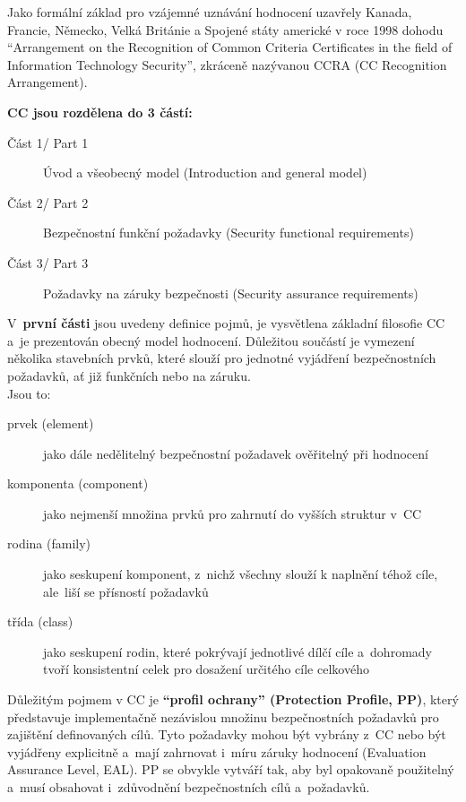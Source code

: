 \documentclass[a4paper,12pt]{article}
\renewcommand{\b}[1]{\textbf{#1}} %
\begin{document}
Jako formální základ pro vzájemné uznávání hodnocení uzavřely Kanada, Francie, Německo, Velká Británie a Spojené státy americké v roce 1998 dohodu “Arrangement on the Recognition of
Common Criteria Certificates in the field of Information Technology Security”, zkráceně nazývanou CCRA (CC Recognition Arrangement).~\cite{NBUHodnoceniBezpecnostiSW}

\b{CC jsou rozdělena do 3 částí:}
\begin{description}
 \item[Část 1/ Part 1] Úvod a všeobecný model (Introduction and general model)
 \item[Část 2/ Part 2] Bezpečnostní funkční požadavky (Security functional requirements)
 \item[Část 3/ Part 3] Požadavky na záruky bezpečnosti (Security assurance requirements)
 \end{description}

V~\b{první části} jsou uvedeny definice pojmů, je vysvětlena základní filosofie CC a~je prezentován obecný model hodnocení. Důležitou součástí je vymezení několika stavebních prvků, které slouží pro jednotné vyjádření bezpečnostních požadavků, ať již funkčních nebo na záruku.~\cite{NBUHodnoceniBezpecnostiSW}\\

Jsou to:
\begin{description}
 \item[prvek (element)] jako dále nedělitelný bezpečnostní požadavek ověřitelný při hodnocení
 \item[komponenta (component)] jako nejmenší množina prvků pro zahrnutí do vyšších struktur v~CC
 \item[rodina (family)] jako seskupení komponent, z~nichž všechny slouží k naplnění téhož cíle, ale~liší se přísností požadavků
 \item[třída (class)]jako seskupení rodin, které pokrývají jednotlivé dílčí cíle a~dohromady tvoří konsistentní celek pro dosažení určitého cíle celkového
 \end{description}

Důležitým pojmem v CC je \b{“profil ochrany” (Protection Profile, PP)}, který představuje implementačně nezávislou množinu bezpečnostních požadavků pro zajištění definovaných cílů. Tyto požadavky mohou být vybrány z~CC nebo být vyjádřeny explicitně a~mají zahrnovat i~míru záruky hodnocení (Evaluation Assurance Level, EAL). PP se obvykle vytváří tak, aby byl opakovaně použitelný a~musí obsahovat i~zdůvodnění bezpečnostních cílů a~požadavků.~\cite{NBUHodnoceniBezpecnostiSW}
\end{document}
